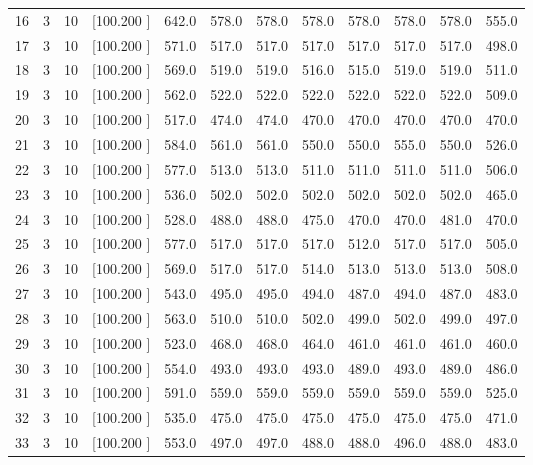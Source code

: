 \documentclass[12pt,a4paper]{article}
\begin{document}
\begin{center}
{\begin{tabular}{r r r r r r r r r r r r}
  16&  3& 10&[100.200   ]&   642.0&   578.0&   578.0&   578.0&   578.0&   578.0&   578.0&   555.0\\[-0.02in]
  17&  3& 10&[100.200   ]&   571.0&   517.0&   517.0&   517.0&   517.0&   517.0&   517.0&   498.0\\[-0.02in]
  18&  3& 10&[100.200   ]&   569.0&   519.0&   519.0&   516.0&   515.0&   519.0&   519.0&   511.0\\[-0.02in]
  19&  3& 10&[100.200   ]&   562.0&   522.0&   522.0&   522.0&   522.0&   522.0&   522.0&   509.0\\[-0.02in]
  20&  3& 10&[100.200   ]&   517.0&   474.0&   474.0&   470.0&   470.0&   470.0&   470.0&   470.0\\[-0.02in]
  21&  3& 10&[100.200   ]&   584.0&   561.0&   561.0&   550.0&   550.0&   555.0&   550.0&   526.0\\[-0.02in]
  22&  3& 10&[100.200   ]&   577.0&   513.0&   513.0&   511.0&   511.0&   511.0&   511.0&   506.0\\[-0.02in]
  23&  3& 10&[100.200   ]&   536.0&   502.0&   502.0&   502.0&   502.0&   502.0&   502.0&   465.0\\[-0.02in]
  24&  3& 10&[100.200   ]&   528.0&   488.0&   488.0&   475.0&   470.0&   470.0&   481.0&   470.0\\[-0.02in]
  25&  3& 10&[100.200   ]&   577.0&   517.0&   517.0&   517.0&   512.0&   517.0&   517.0&   505.0\\[-0.02in]
  26&  3& 10&[100.200   ]&   569.0&   517.0&   517.0&   514.0&   513.0&   513.0&   513.0&   508.0\\[-0.02in]
  27&  3& 10&[100.200   ]&   543.0&   495.0&   495.0&   494.0&   487.0&   494.0&   487.0&   483.0\\[-0.02in]
  28&  3& 10&[100.200   ]&   563.0&   510.0&   510.0&   502.0&   499.0&   502.0&   499.0&   497.0\\[-0.02in]
  29&  3& 10&[100.200   ]&   523.0&   468.0&   468.0&   464.0&   461.0&   461.0&   461.0&   460.0\\[-0.02in]
  30&  3& 10&[100.200   ]&   554.0&   493.0&   493.0&   493.0&   489.0&   493.0&   489.0&   486.0\\[-0.02in]
  31&  3& 10&[100.200   ]&   591.0&   559.0&   559.0&   559.0&   559.0&   559.0&   559.0&   525.0\\[-0.02in]
  32&  3& 10&[100.200   ]&   535.0&   475.0&   475.0&   475.0&   475.0&   475.0&   475.0&   471.0\\[-0.02in]
  33&  3& 10&[100.200   ]&   553.0&   497.0&   497.0&   488.0&   488.0&   496.0&   488.0&   483.0\\[-0.02in]

\end{tabular}}
\end{center}
\end{document}
